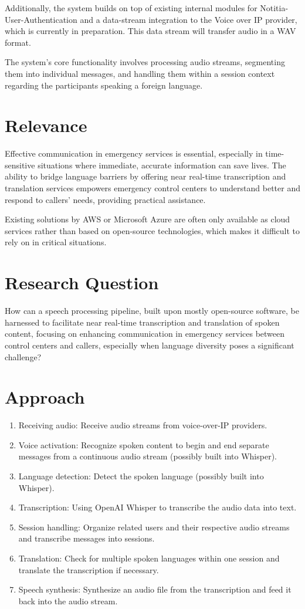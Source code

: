\documentclass[a4paper,10pt]{article}
\begin{document}
Additionally, the system builds on top of existing internal modules for Notitia-User-Authentication and a data-stream integration to the Voice over IP provider, which is currently in preparation. This data stream will transfer audio in a WAV format.

The system's core functionality involves processing audio streams, segmenting them into individual messages, and handling them within a session context regarding the participants speaking a foreign language.


\section{Relevance}
Effective communication in emergency services is essential, especially in time-sensitive situations where immediate, accurate information can save lives.
The ability to bridge language barriers by offering near real-time transcription and translation services empowers emergency control centers to understand better and respond to callers' needs, providing practical assistance.

Existing solutions by AWS or Microsoft Azure are often only available as cloud services rather than based on open-source technologies, which makes it difficult to rely on in critical situations.


\section{Research Question}
How can a speech processing pipeline, built upon mostly open-source software, be harnessed to facilitate near real-time transcription and translation of spoken content, focusing on enhancing communication in emergency services between control centers and callers, especially when language diversity poses a significant challenge?


\section{Approach}
\begin{enumerate}
  \item Receiving audio: Receive audio streams from voice-over-IP providers.
  \item Voice activation: Recognize spoken content to begin and end separate messages from a continuous audio stream (possibly built into Whisper).
  \item Language detection: Detect the spoken language  (possibly built into Whisper).
  \item Transcription: Using OpenAI Whisper to transcribe the audio data into text.
  \item Session handling: Organize related users and their respective audio streams and transcribe messages into sessions.
  \item Translation: Check for multiple spoken languages within one session and translate the transcription if necessary.
  \item Speech synthesis: Synthesize an audio file from the transcription and feed it back into the audio stream.
\end{enumerate}
\end{document}
